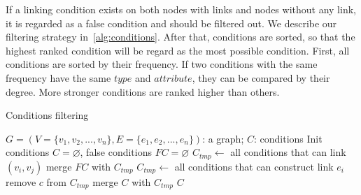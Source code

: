 If a linking condition exists on both nodes with links and nodes without any link, it is regarded as a false condition and should be filtered out.
We describe our filtering strategy in~\ref{alg:conditions}.
After that, conditions are sorted, so that the highest ranked condition will be regard as the most possible condition.
First, all conditions are sorted by their frequency.
If two conditions with the same frequency have the same $type$ and $attribute$, they can be compared by their degree.
More stronger conditions are ranked higher than others.





\begin{algorithm}[!t]
    \renewcommand\arraystretch{1.2}
    \caption{ Conditions filtering }
    \label{alg:conditions}
    \begin{algorithmic}[1]
        \Require
            $G=(V=\{v_1, v_2, ..., v_n\}, E=\{e_1, e_2, ..., e_n\})$: a graph;
        \Ensure
            $C$: conditions
        \State Init conditions $C=\varnothing$, false conditions $FC=\varnothing$
                \State $C_{tmp} \gets$ all conditions that can link $(v_i, v_j)$
                \State merge $FC$ with $C_{tmp}$
            \EndIf
        \EndFor
            \State $C_{tmp} \gets$ all conditions that can construct link $e_i$
                    \State remove $c$ from $C_{tmp}$
                \EndIf
            \EndFor
            \State merge $C$ with $C_{tmp}$
        \EndFor
        \State \Return $C$
    \end{algorithmic}
\end{algorithm}


